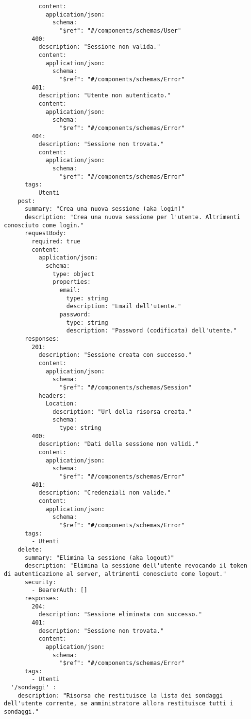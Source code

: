 \begin{verbatim}
          content:
            application/json:
              schema:
                "$ref": "#/components/schemas/User"
        400:
          description: "Sessione non valida."
          content:
            application/json:
              schema:
                "$ref": "#/components/schemas/Error"
        401:
          description: "Utente non autenticato."
          content:
            application/json:
              schema:
                "$ref": "#/components/schemas/Error"
        404:
          description: "Sessione non trovata."
          content:
            application/json:
              schema:
                "$ref": "#/components/schemas/Error"
      tags:
        - Utenti
    post: 
      summary: "Crea una nuova sessione (aka login)"
      description: "Crea una nuova sessione per l'utente. Altrimenti conosciuto come login."
      requestBody:
        required: true
        content:
          application/json:
            schema:
              type: object
              properties:
                email:
                  type: string
                  description: "Email dell'utente."
                password:
                  type: string
                  description: "Password (codificata) dell'utente."
      responses:
        201:
          description: "Sessione creata con successo."
          content:
            application/json:
              schema:
                "$ref": "#/components/schemas/Session"
          headers:
            Location: 
              description: "Url della risorsa creata."
              schema:
                type: string
        400:
          description: "Dati della sessione non validi."
          content:
            application/json:
              schema:
                "$ref": "#/components/schemas/Error"
        401:
          description: "Credenziali non valide."
          content:
            application/json:
              schema:
                "$ref": "#/components/schemas/Error"
      tags:
        - Utenti
    delete: 
      summary: "Elimina la sessione (aka logout)"
      description: "Elimina la sessione dell'utente revocando il token di autenticazione al server, altrimenti conosciuto come logout."
      security:
        - BearerAuth: []
      responses:
        204:
          description: "Sessione eliminata con successo."
        401:
          description: "Sessione non trovata."
          content:
            application/json:
              schema:
                "$ref": "#/components/schemas/Error"
      tags:
        - Utenti
  '/sondaggi' :
    description: "Risorsa che restituisce la lista dei sondaggi dell'utente corrente, se amministratore allora restituisce tutti i sondaggi."

\end{verbatim}

